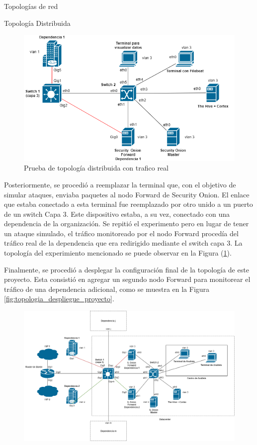 \begin{section}{Topologías de red }
\begin{subsection} {Topología Distribuida}
\begin{figure}[H]
            \centering
             \includegraphics[width=1\textwidth]{./iteracion_1_imagenes/figura_33_d_topologia_de_prueba_4.png}
                \caption{Prueba de topología distribuida con trafico real}
              \label{fig:topologia_distribuida_4}
            \end{figure}
            \FloatBarrier
            Posteriormente, se procedió a reemplazar la terminal que, con el objetivo de simular ataques, enviaba paquetes al nodo Forward de Security Onion. El enlace que estaba conectado a esta terminal fue reemplazado por otro unido a un puerto de un switch Capa 3. Este dispositivo estaba, a su vez, conectado con una dependencia de la organización. Se repitió el experimento pero en lugar de tener un ataque simulado, el tráfico monitoreado por el nodo Forward procedía del tráfico real de la dependencia que era redirigido mediante el switch capa 3. La topología del experimiento mencionado se puede observar en la Figura (\ref{fig:topologia_distribuida_4}).\par
            Finalmente, se procedió a desplegar la configuración final de la topología de este proyecto. Esta consistió en agregar un segundo nodo Forward para monitorear el tráfico de una dependencia adicional, como se muestra en la Figura \ref{fig:topologia_despliegue_proyecto}.
            \par
            \begin{figure}[H]
                \centering
                \includegraphics[width=1\textwidth]{./iteracion_1_imagenes/figura_33_arquitectura_despliegue_proyecto.png}

\end{figure}
\end{subsection}
\end{section}

